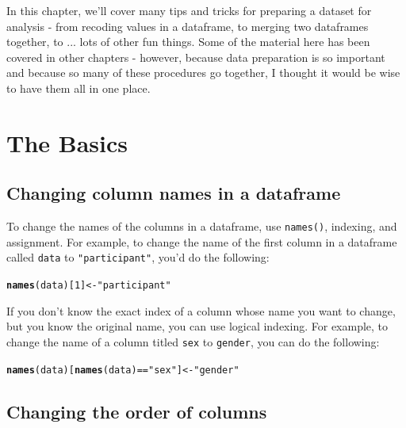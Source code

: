 \documentclass{tufte-book}\usepackage[]{graphicx}\usepackage[]{color}
\makeatletter
\newcommand{\hlnum}[1]{\textcolor[rgb]{0.686,0.059,0.569}{#1}}%
\newcommand{\hlstr}[1]{\textcolor[rgb]{0.192,0.494,0.8}{#1}}%
\newcommand{\hlopt}[1]{\textcolor[rgb]{0,0,0}{#1}}%
\newcommand{\hlstd}[1]{\textcolor[rgb]{0.345,0.345,0.345}{#1}}%
\newcommand{\hlkwb}[1]{\textcolor[rgb]{0.69,0.353,0.396}{#1}}%
\newcommand{\hlkwd}[1]{\textcolor[rgb]{0.737,0.353,0.396}{\textbf{#1}}}%
\newenvironment{kframe}{%
 \def\at@end@of@kframe{}%
 \ifinner\ifhmode%
  \def\at@end@of@kframe{\end{minipage}}%
  \begin{minipage}{\columnwidth}%
 \fi\fi%
 \def\FrameCommand##1{\hskip\@totalleftmargin \hskip-\fboxsep
 \colorbox{shadecolor}{##1}\hskip-\fboxsep
     \hskip-\linewidth \hskip-\@totalleftmargin \hskip\columnwidth}%
 \MakeFramed {\advance\hsize-\width
   \@totalleftmargin\z@ \linewidth\hsize
   \@setminipage}}%
 {\par\unskip\endMakeFramed%
 \at@end@of@kframe}
\newenvironment{knitrout}{}{} %
\makeatother
\begin{document}
In this chapter, we'll cover many tips and tricks for preparing a dataset for analysis - from recoding values in a dataframe, to merging two dataframes together, to ... lots of other fun things. Some of the material here has been covered in other chapters - however, because data preparation is so important and because so many of these procedures go together, I thought it would be wise to have them all in one place.

\section{The Basics}

\subsection{Changing column names in a dataframe}

To change the names of the columns in a dataframe, use \texttt{names()}, indexing, and assignment. For example, to change the name of the first column in a dataframe called \texttt{data} to \texttt{"participant"}, you'd do the following:

\begin{knitrout}
\color{fgcolor}\begin{kframe}
\begin{alltt}
\hlkwd{names}\hlstd{(data)[}\hlnum{1}\hlstd{]} \hlkwb{<-} \hlstr{"participant"}
\end{alltt}
\end{kframe}
\end{knitrout}

If you don't know the exact index of a column whose name you want to change, but you know the original name, you can use logical indexing. For example, to change the name of a column titled \texttt{sex} to \texttt{gender}, you can do the following:

\begin{knitrout}
\color{fgcolor}\begin{kframe}
\begin{alltt}
\hlkwd{names}\hlstd{(data)[}\hlkwd{names}\hlstd{(data)} \hlopt{==} \hlstr{"sex"}\hlstd{]} \hlkwb{<-} \hlstr{"gender"}
\end{alltt}
\end{kframe}
\end{knitrout}

\subsection{Changing the order of columns}
\end{document}
